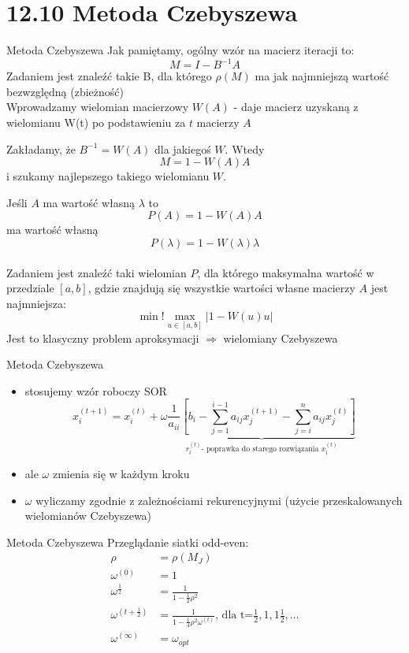 \section{12.10 Metoda Czebyszewa}

\begin{frame}{Metoda Czebyszewa}
  Jak pamiętamy, ogólny wzór na macierz iteracji to:
  $$M=I-B^{-1}A$$
  Zadaniem jest znaleźć takie  B, dla którego $\rho(M)$ ma  jak najmniejszą wartość bezwzględną (zbieżność)\\
  \vspace{0.5cm}
  Wprowadzamy wielomian macierzowy $W(A)$ - daje macierz  uzyskaną z wielomianu W(t) po podstawieniu za $t$ macierzy $A$\\
  \end{frame}
  \begin{frame}
  Zakładamy, że $B^{-1}=W(A)$ dla jakiegoś $W$.
  Wtedy
  $$M=1-W(A)A$$
  i szukamy najlepszego takiego wielomianu $W$.\\
  \vspace{0.5cm}

   Jeśli $A$ ma wartość własną $\lambda$ 
   to
  $$P(A)=1-W(A)A$$ ma wartość własną $$P(\lambda)=1-W(\lambda)\lambda$$\\
  Zadaniem jest znaleźć taki wielomian $P$, dla którego maksymalna wartość w przedziale $[a,b]$, gdzie znajdują się wszystkie wartości własne macierzy $A$  jest najmniejsza:
  $$\min!{\max_{u \in [a,b]}{|1-W(u)u|}}$$
  Jest to klasyczny problem aproksymacji $\Rightarrow$ wielomiany Czebyszewa
\end{frame}

\begin{frame}{Metoda Czebyszewa}
 \begin{itemize}
     \item stosujemy wzór roboczy SOR
     $$x^{(t+1)}_{i}= x^{(t)}_{i} +\omega \underbrace{\frac{1}{a_{ii}}[b_i-\sum^{i-1}_{j=1} a_{ij} x^{(t+1)}_j -\sum^{n}_{j=i} a_{ij} x^{(t)}_j ]}_{r^{(t)}_i \text{- poprawka do starego rozwiązania } x^{(t)}_i}$$
     \item ale $\omega$ zmienia się w  każdym kroku 
     \item $\omega$ wyliczamy zgodnie z zależnościami rekurencyjnymi (użycie przeskalowanych wielomianów Czebyszewa)
 \end{itemize}
 \end{frame}
 \begin{frame}{Metoda Czebyszewa}
  Przeglądanie siatki odd-even:
    \begin{align*}
    \rho &= \rho(M_J)\\
    \omega^{(0)}&=1\\
    \omega^{\frac{1}{2}}&=\frac{1}{1-\frac{1}{2}\rho^2}\\
    \omega^{(t+\frac{1}{2})}&=\frac{1}{1-\frac{1}{4}\rho^2\omega^{(t)}}\text{, dla t=}\frac{1}{2},1,1\frac{1}{2},...\\
    \omega^{(\infty)} &= \omega_{opt}
    \end{align*}
  
\end{frame}

